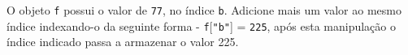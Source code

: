 \documentclass[12pt,varwidth=16cm,border=1pt]{standalone}
\begin{document}
O objeto \verb+f+ possui o valor de \verb+77+, no índice \verb+b+. Adicione mais um valor ao mesmo índice indexando-o da seguinte forma - \verb+f+[\verb+"b"+] = \verb+225+, após esta manipulação o índice indicado  passa a armazenar o valor 225.

\questiomtrue
\end{document}
